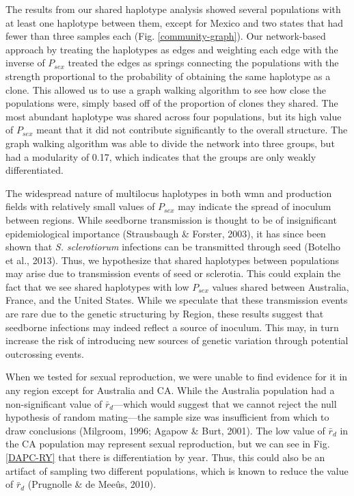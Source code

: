 \documentclass[fleqn,10pt,lineno]{wlpeerj} %
\theoremstyle{definition}
\theoremstyle{definition}
\theoremstyle{definition}
\theoremstyle{remark}
\begin{document}
The results from our shared haplotype analysis showed several
populations with at least one haplotype between them, except for Mexico
and two states that had fewer than three samples each (Fig.
\ref{community-graph}). Our network-based approach by treating the
haplotypes as edges and weighting each edge with the inverse of
\(P_{sex}\) treated the edges as springs connecting the populations with
the strength proportional to the probability of obtaining the same
haplotype as a clone. This allowed us to use a graph walking algorithm
to see how close the populations were, simply based off of the
proportion of clones they shared. The most abundant haplotype was shared
across four populations, but its high value of \(P_{sex}\) meant that it
did not contribute significantly to the overall structure. The graph
walking algorithm was able to divide the network into three groups, but
had a modularity of 0.17, which indicates that the groups are only
weakly differentiated.

The widespread nature of multilocus haplotypes in both wmn and
production fields with relatively small values of \(P_{sex}\) may
indicate the spread of inoculum between regions. While seedborne
transmission is thought to be of insignificant epidemiological
importance (Strausbaugh \& Forster, 2003), it has since been shown that
\emph{S. sclerotiorum} infections can be transmitted through seed
(Botelho et al., 2013). Thus, we hypothesize that shared haplotypes
between populations may arise due to transmission events of seed or
sclerotia. This could explain the fact that we see shared haplotypes
with low \(P_{sex}\) values shared between Australia, France, and the
United States. While we speculate that these transmission events are
rare due to the genetic structuring by Region, these results suggest
that seedborne infections may indeed reflect a source of inoculum. This
may, in turn increase the risk of introducing new sources of genetic
variation through potential outcrossing events.

When we tested for sexual reproduction, we were unable to find evidence
for it in any region except for Australia and CA. While the Australia
population had a non-significant value of \(\bar{r}_d\)---which would
suggest that we cannot reject the null hypothesis of random mating---the
sample size was insufficient from which to draw conclusions (Milgroom,
1996; Agapow \& Burt, 2001). The low value of \(\bar{r}_d\) in the CA
population may represent sexual reproduction, but we can see in Fig.
\ref{DAPC-RY} that there is differentiation by year. Thus, this could
also be an artifact of sampling two different populations, which is
known to reduce the value of \(\bar{r}_d\) (Prugnolle \& de Meeûs,
2010).
\end{document}
